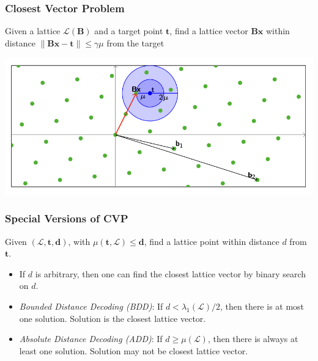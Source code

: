 \documentclass{beamer}
\begin{document}
\begin{frame}
	\frametitle{Closest Vector Problem}
	\begin{definition}
		Given a lattice $\mathcal{L}(\mathbf{B})$ and a target point $\mathbf{t}$, find a lattice vector $\mathbf{B x}$ within distance $\|\mathbf{B} \mathbf{x}-\mathbf{t}\| \leq \gamma \mu$ from the target
		
	\end{definition}
	
	\includegraphics[scale=0.7]{cvp.png}
	

\end{frame}



\begin{frame}
	\frametitle{Special Versions of CVP}

	\begin{definition}
		Given $(\mathcal{L}, \mathbf{t}, \boldsymbol{d})$, with $\mu(\mathbf{t}, \mathcal{L}) \leq \boldsymbol{d}$, find a lattice point within distance $d$ from $\boldsymbol{t}$.
	\end{definition}
	
	\begin{itemize}
		\item If $d$ is arbitrary, then one can find the closest lattice vector by binary search on $d$.
		\item \emph{Bounded Distance Decoding (BDD)}: If $d<\lambda_1(\mathcal{L}) / 2$, then there is at most one solution. Solution is the closest lattice vector.
		\item \emph{Absolute Distance Decoding (ADD)}: If $d \geq \mu(\mathcal{L})$, then there is always at least one solution. Solution may not be closest lattice vector.


	\end{itemize}
\end{frame}
\end{document}
